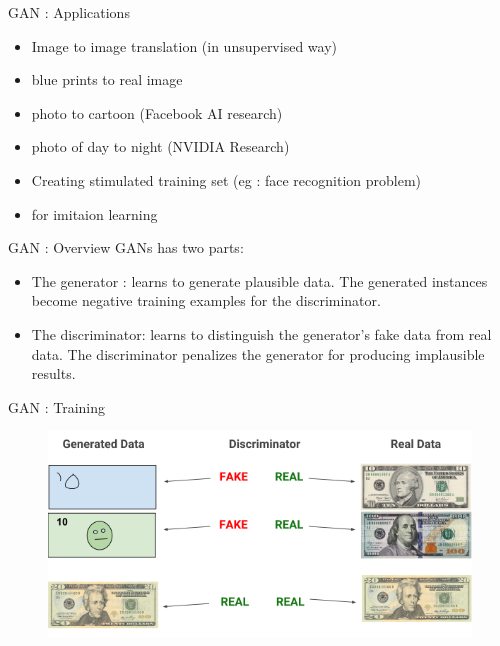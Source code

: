 \documentclass[10pt]{beamer}
\begin{document}
\begin{frame}[fragile]{GAN : Applications}

    \begin{itemize}
        \item Image to image translation (in unsupervised way)
        \item blue prints to real image
        \item photo to cartoon (Facebook AI research)
        \item photo of day to night (NVIDIA Research)
        \item Creating stimulated training set (eg : face recognition problem)
        \item for imitaion learning
    \end{itemize}
\end{frame}

\begin{frame}[fragile]{GAN : Overview}
 GANs has two parts: \\
    \begin{itemize}
        \item The generator : learns to generate plausible data. The generated instances become negative training examples for the discriminator.

        \item The discriminator: learns to distinguish the generator's fake data from real data. The discriminator penalizes the generator for producing implausible results.
    \end{itemize}
\end{frame}


\begin{frame}[fragile]{GAN : Training}
     \begin{figure}[ht]
         \hspace*{-1cm}\includegraphics[width=0.7\linewidth]{gantrain} \\ \\ \\ \\ \\ 


    \end{figure}
\end{frame}
\end{document}
